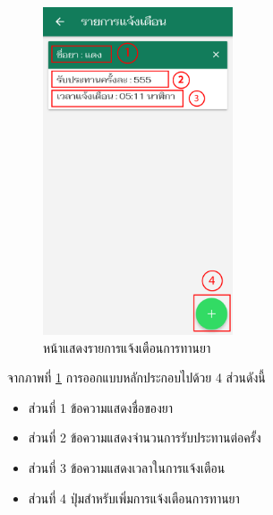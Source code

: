 		\begin{figure}[H]
			\centering
			\includegraphics[width=0.5\textwidth]{Figures/3/UI/notification}
			\caption{หน้าแสดงรายการแจ้งเตือนการทานยา}
			\label{Fig:รายการทานยา}
		\end{figure}
		จากภาพที่ \ref{Fig:รายการทานยา} การออกแบบหลักประกอบไปด้วย 4 ส่วนดังนี้
		\begin{itemize}
			\item ส่วนที่ 1 ข้อความแสดงชื่อของยา
			\item ส่วนที่ 2 ข้อความแสดงจำนวนการรับประทานต่อครั้ง
			\item ส่วนที่ 3 ข้อความแสดงเวลาในการแจ้งเตือน
			\item ส่วนที่ 4 ปุ่มสำหรับเพิ่มการแจ้งเตือนการทานยา
		\end{itemize} \\

